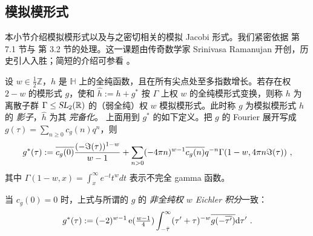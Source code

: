 \documentclass[11pt,a4paper,fontset=windows]{ctexart}
\numberwithin{equation}{section}
\newcommand{\SL}{\operatorname{\textsl{SL}}}      %
\newcommand{\RR}{\mathbb{R}}
\newcommand{\HH}{\mathbb{H}}
\newcommand{\ZZ}{\mathbb{Z}}
\def\inf{\infty}
\def\p{\pi}
\def\t{\tau}
\newcommand{\ex}{\operatorname{e}} %
\newcommand{\be}{\begin{equation}}
\newcommand{\ee}{\end{equation}}
\begin{document}
\subsection{模拟模形式}
\label{subsec:MMF}

本小节介绍模拟模形式以及与之密切相关的模拟 Jacobi 形式。我们紧密依据 \cite{Dabholkar:2012nd} 第 7.1 节与 \cite{omjt} 第 3.2 节的处理。这一课题由传奇数学家 Srinivasa Ramanujan 开创，历史引人入胜；简短的介绍可参看 \cite{zagier_mock}。

设 $w\in \frac12\ZZ$，$h$ 是 $\HH$ 上的全纯函数，且在所有尖点处至多指数增长。若存在权 $2-w$ 的模形式 $g$，使和 $\hat h:= h+ g^\ast$ 按 $\Gamma$ 上权 $w$ 的全纯模形式变换，则称 $h$ 为离散子群 $\Gamma \leq \SL_2(\RR)$ 的（弱全纯）权 $w$ 模拟模形式。此时称 $g$ 为模拟模形式 $h$ 的 {\em 影子}，$\hat h$ 为其 {\em 完备化}。
上面用到 $g^\ast$ 的如下定义。把 $g$ 的 Fourier 展开写成 $g(\t) = \sum_{n\geq 0} c_g(n) q^n$，则
\be \label{def:int_shadow}
g^\ast(\t)  := \overline{c_g(0)} {(-\Im(\t))^{1-w}\over w-1} +\sum_{n>0} (-4\p n)^{w-1}\overline{c_g(n)} q^{-n} \Gamma(1-w,4\pi n \Im(\t))~,
\ee
其中 $\Gamma(1-w,x) = \int_{x}^{\infty} e^{-t} t^{w} dt$ 表示不完全 gamma 函数。



当 $c_g(0)=0$ 时，上式与所谓的 $g$ 的 {\em 非全纯权 $w$ Eichler 积分}一致：
\be\label{def:Eichler_integral}
g^\ast (\t):= (-2)^{w-1}\ex(\tfrac{w-1}{4}) \int_{-\bar \tau}^\inf (\t'+\t)^{-w} \overline{g(-\overline{\t'})} {\rm d}\t'~. 
\ee

\end{document}
